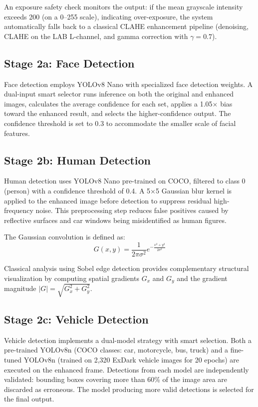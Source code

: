\documentclass[conference]{IEEEtran}
\begin{document}
An exposure safety check monitors the output: if the mean grayscale intensity exceeds 200 (on a 0--255 scale), indicating over-exposure, the system automatically falls back to a classical CLAHE enhancement pipeline (denoising, CLAHE on the LAB L-channel, and gamma correction with $\gamma = 0.7$).

\subsection{Stage 2a: Face Detection}

Face detection employs YOLOv8 Nano with specialized face detection weights. A dual-input smart selector runs inference on both the original and enhanced images, calculates the average confidence for each set, applies a 1.05$\times$ bias toward the enhanced result, and selects the higher-confidence output. The confidence threshold is set to 0.3 to accommodate the smaller scale of facial features.

\subsection{Stage 2b: Human Detection}

Human detection uses YOLOv8 Nano pre-trained on COCO, filtered to class 0 (person) with a confidence threshold of 0.4. A 5$\times$5 Gaussian blur kernel is applied to the enhanced image before detection to suppress residual high-frequency noise. This preprocessing step reduces false positives caused by reflective surfaces and car windows being misidentified as human figures.

The Gaussian convolution is defined as:
\begin{equation}
G(x,y) = \frac{1}{2\pi\sigma^2} e^{-\frac{x^2+y^2}{2\sigma^2}}
\label{eq:gaussian}
\end{equation}

Classical analysis using Sobel edge detection provides complementary structural visualization by computing spatial gradients $G_x$ and $G_y$ and the gradient magnitude $|G| = \sqrt{G_x^2 + G_y^2}$.

\subsection{Stage 2c: Vehicle Detection}

Vehicle detection implements a dual-model strategy with smart selection. Both a pre-trained YOLOv8n (COCO classes: car, motorcycle, bus, truck) and a fine-tuned YOLOv8n (trained on 2,320 ExDark vehicle images for 20 epochs) are executed on the enhanced frame. Detections from each model are independently validated: bounding boxes covering more than 60\% of the image area are discarded as erroneous. The model producing more valid detections is selected for the final output.
\end{document}
